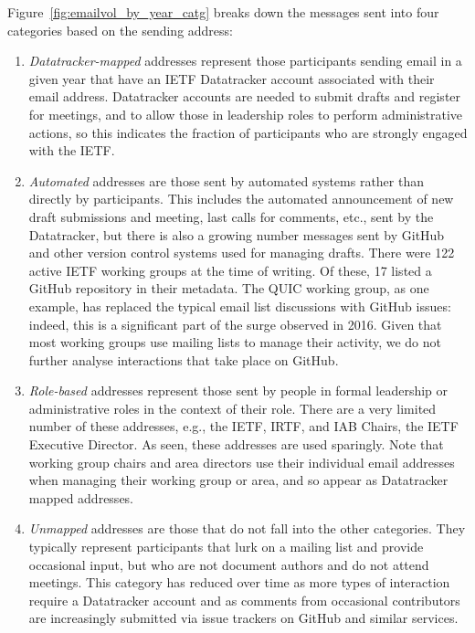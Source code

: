 \documentclass[twocolumn,10pt]{article}
\begin{document}
Figure~\ref{fig:emailvol_by_year_catg} breaks down the messages sent into
four categories based on the sending address:
\begin{enumerate}
  \item \emph{Datatracker-mapped} addresses represent those participants
    sending email in a given year that have an IETF Datatracker account
    associated with their email address. Datatracker accounts are needed to
    submit drafts and register for meetings, and to allow those in
    leadership roles to perform administrative actions, so this indicates
    the fraction of participants who are strongly engaged with the IETF.

  \item \emph{Automated} addresses are those sent by automated systems
    rather than directly by participants. This includes the automated
    announcement of new draft submissions and meeting, last calls for
    comments, etc., sent by the Datatracker, but there is also a growing
    number messages sent by GitHub and other version control systems used
    for managing drafts.
    There were 122 active IETF working groups at the time of writing.
    Of these, 17 listed a GitHub repository in their metadata. The QUIC
    working group, as one example, has replaced the typical email list
    discussions with GitHub issues: indeed, this is a significant part of
    the surge observed in 2016.  Given that most working groups use mailing
    lists to manage their activity, we do not further analyse interactions
    that take place on GitHub. 

  \item \emph{Role-based} addresses represent those sent by people in
    formal leadership or administrative roles in the context of their role.
    There are a very limited number of these addresses, e.g., the IETF,
    IRTF, and IAB Chairs, the IETF Executive Director. As seen, these
    addresses are used sparingly. Note that working group chairs and area
    directors use their individual email addresses when managing their
    working group or area, and so appear as Datatracker mapped addresses.

  \item \emph{Unmapped} addresses are those that do not fall into the other
    categories. They typically represent participants that lurk on a
    mailing list and provide occasional input, but who are not document
    authors and do not attend meetings. This category has reduced over time
    as more types of interaction require a Datatracker account and as
    comments from occasional contributors are increasingly submitted via
    issue trackers on GitHub and similar services.

\end{enumerate}
\end{document}
